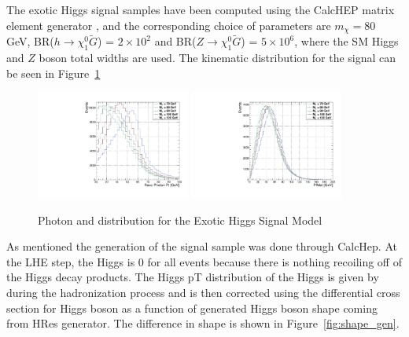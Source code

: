 The exotic Higgs signal samples have been computed using the CalcHEP matrix element generator \cite{calchep},\cite{calchep2} and the corresponding choice of parameters are $m_\chi = 80$ GeV, BR($h\to \chi_1^0\tilde{G}$) = $2\times 10^{2}$ and BR($Z\to \chi_1^0\tilde{G}$) = $5\times 10^{6}$, where the SM Higgs and $Z$ boson total widths are used. The kinematic distribution for the signal can be seen in Figure~\ref{fig:signal_kinematics}

\begin{figure}[htb]
\begin{center}
{\includegraphics[width=0.45\textwidth]{analysis_figs/signal_photon.pdf}}\hfill
{\includegraphics[width=0.45\textwidth]{analysis_figs/signal_met.pdf}}\hfill
\caption{Photon \ET and \met distribution for the Exotic Higgs Signal Model}
\label{fig:signal_kinematics}
\end{center}
\end{figure}

As mentioned the generation of the signal sample was done through CalcHep. At the LHE step, the Higgs \pt is 0 for all events because there is nothing recoiling off of the Higgs decay products. The Higgs pT distribution of the Higgs is given by \PYTHIA during the hadronization process and is then corrected using the differential cross section for Higgs boson as a function of generated Higgs boson \et shape coming from HRes generator. The difference in shape is shown in Figure~\ref{fig:shape_gen}. 

